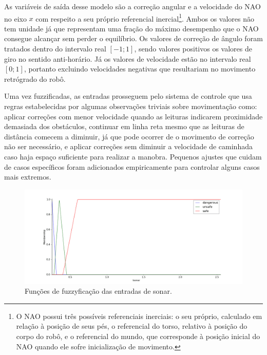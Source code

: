\documentclass[twoside,conference,a4paper]{IEEEtran}
\begin{document}
As variáveis de saída desse modelo são a correção angular e a velocidade do NAO no eixo $x$ com respeito a seu próprio referencial inercial\footnote{O NAO possui três possíveis referenciais inerciais: o seu próprio, calculado em relação à posição de seus pés, o referencial do torso, relativo à posição do corpo do robô, e o referencial do mundo, que corresponde à posição inicial do NAO quando ele sofre inicialização de movimento.}. Ambos os valores não tem unidade já que representam uma fração do máximo desempenho que o NAO consegue alcançar sem perder o equilíbrio. Os valores de correção de ângulo foram tratados dentro do intervalo real $[-1;1]$, sendo valores positivos os valores de giro no sentido anti-horário. Já os valores de velocidade estão no intervalo real $[0;1]$, portanto excluindo velocidades negativas que resultariam no movimento retrógrado do robô.

Uma vez fuzzificadas, as entradas prosseguem pelo sistema de controle que usa regras estabelecidas por algumas observações triviais sobre movimentação como: aplicar correções com menor velocidade quando as leituras indicarem proximidade demasiada dos obstáculos, continuar em linha reta mesmo que as leituras de distância comecem a diminuir, já que pode ocorrer de o movimento de correção não ser necessário, e aplicar correções sem diminuir a velocidade de caminhada caso haja espaço suficiente para realizar a manobra. Pequenos ajustes que cuidam de casos específicos foram adicionados empiricamente para controlar alguns casos mais extremos.

\begin{figure}[ht]
\centering
\includegraphics[width=1\hsize]{figuras/sonar_fuzzy.png}
\caption{Funções de fuzzyficação das entradas de sonar.}
\label{fig:sonar-fuzzy}
\end{figure}
\end{document}
